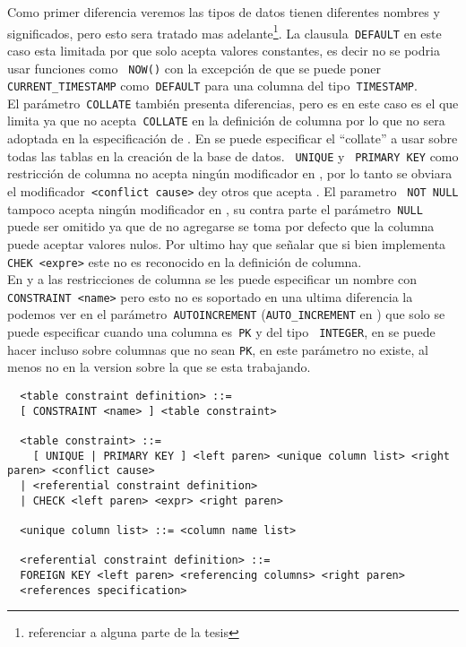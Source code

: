 Como primer diferencia veremos las tipos de datos tienen diferentes nombres y significados, pero esto sera tratado mas adelante\footnote{referenciar a alguna parte de la tesis}. La clausula\verb= DEFAULT= en este caso esta limitada por \m que solo acepta valores constantes, es decir no se podria usar funciones como \verb= NOW()= con la excepción de que se puede poner\verb= CURRENT_TIMESTAMP= como\verb= DEFAULT= para una columna del tipo\verb= TIMESTAMP=.\\

El parámetro\verb= COLLATE= también presenta diferencias, pero es en este caso es \p el que limita ya que no acepta\verb= COLLATE= en la definición de columna por lo que no sera adoptada en la especificación de \cc. En \p se puede especificar el ``collate'' a usar sobre todas las tablas en la creación de la base de datos. \verb= UNIQUE= y \verb= PRIMARY KEY= como restricción de columna no acepta ningún modificador en \m, por lo tanto se obviara el modificador\verb= <conflict cause>= de\s y otros que acepta \p. El parametro \verb= NOT NULL= tampoco acepta ningún modificador en \m, su contra parte el parámetro\verb= NULL= puede ser omitido ya que de no agregarse se toma por defecto que la columna puede aceptar valores nulos. Por ultimo hay que señalar que \m si bien implementa\verb= CHEK <expre>= este no es reconocido en la definición de columna.\\

En \s y \p a las restricciones de columna se les puede especificar un nombre con \verb=CONSTRAINT <name>= pero esto no es soportado en \m una ultima diferencia la podemos ver en el parámetro\verb= AUTOINCREMENT= (\verb=AUTO_INCREMENT= en \m) que solo se puede especificar cuando una columna es\verb= PK= y del tipo \verb= INTEGER=, en \m se puede hacer incluso sobre columnas que no sean \verb=PK=, en \p este parámetro no existe, al menos no en la version  sobre la que se esta trabajando.  

\begin{Verbatim}
  <table constraint definition> ::=
  [ CONSTRAINT <name> ] <table constraint>

  <table constraint> ::=
    [ UNIQUE | PRIMARY KEY ] <left paren> <unique column list> <right paren> <conflict cause>
  | <referential constraint definition>
  | CHECK <left paren> <expr> <right paren>

  <unique column list> ::= <column name list>

  <referential constraint definition> ::=
  FOREIGN KEY <left paren> <referencing columns> <right paren>
  <references specification>
\end{Verbatim}

